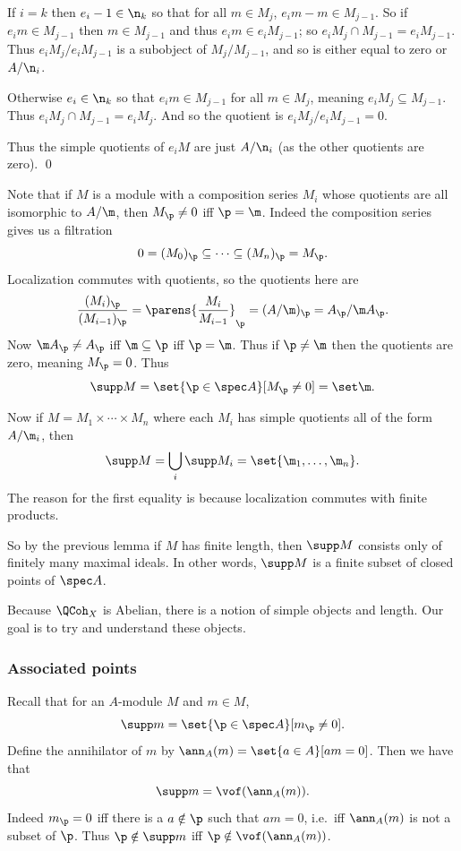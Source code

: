     If $i=k$ then $e_i-1\in\n_k$ so that for all $m\in M_j$, $e_im-m\in M_{j-1}$.
    So if $e_im\in M_{j-1}$ then $m\in M_{j-1}$ and thus $e_im\in e_iM_{j-1}$; so $e_iM_j\cap M_{j-1}=e_iM_{j-1}$.
    Thus $e_iM_j/e_iM_{j-1}$ is a subobject of $M_j/M_{j-1}$, and so is either equal to zero or $A/\n_i$.

    Otherwise $e_i\in\n_k$ so that $e_im\in M_{j-1}$ for all $m\in M_j$, meaning $e_iM_j\subseteq M_{j-1}$.
    Thus $e_iM_j\cap M_{j-1}=e_iM_j$.
    And so the quotient is $e_iM_j/e_iM_{j-1}=0$.

    Thus the simple quotients of $e_iM$ are just $A/\n_i$ (as the other quotients are zero).
    \qed

\eproof

Note that if $M$ is a module with a composition series $M_i$ whose quotients are all isomorphic to $A/\m$, then $M_\p\neq0$ iff $\p=\m$.
Indeed the composition series gives us a filtration
$$ 0 = (M_0)_\p \subseteq \cdots \subseteq (M_n)_\p = M_\p . $$
Localization commutes with quotients, so the quotients here are
$$ \frac{(M_i)_\p}{(M_{i-1})_\p} = \parens{\frac{M_i}{M_{i-1}}}_\p = (A/\m)_\p = A_\p/\m A_\p . $$
Now $\m A_\p\neq A_\p$ iff $\m\subseteq\p$ iff $\p=\m$.
Thus if $\p\neq\m$ then the quotients are zero, meaning $M_\p=0$.
Thus
$$ \supp M = \set{\p\in\spec A}[M_\p\neq0] = \set\m . $$

Now if $M=M_1\times\cdots\times M_n$ where each $M_i$ has simple quotients all of the form $A/\m_i$, then
$$ \supp M = \bigcup_i\supp M_i = \set{\m_1,\dots,\m_n} . $$
The reason for the first equality is because localization commutes with finite products.

So by the previous lemma if $M$ has finite length, then $\supp M$ consists only of finitely many maximal ideals.
In other words, $\supp M$ is a finite subset of closed points of $\spec A$.

Because $\QCoh_X$ is Abelian, there is a notion of simple objects and length.
Our goal is to try and understand these objects.

\subsubsection{Associated points}

Recall that for an $A$-module $M$ and $m\in M$,
$$ \supp m = \set{\p\in\spec A}[m_\p\neq0] . $$
Define the annihilator of $m$ by $\ann_A(m)=\set{a\in A}[am=0]$.
Then we have that
$$ \supp m = \vof(\ann_A(m)) . $$
Indeed $m_\p=0$ iff there is a $a\notin\p$ such that $am=0$, i.e.\ iff $\ann_A(m)$ is not a subset of $\p$.
Thus $\p\notin\supp m$ iff $\p\notin\vof(\ann_A(m))$.

